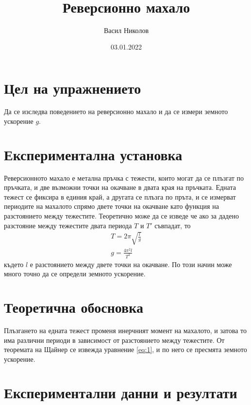 \documentclass[aps, prb, twocolumn, a4paper, floatfix, reprint]{revtex4-2}
\begin{document}
\title{Реверсионно махало}
\author{Васил Николов}
\noaffiliation
\date{03.01.2022}
\maketitle

\section{Цел на упражнението}
Да се изследва поведението на реверсионно махало и да се измери земното ускорение $g$.

\section{Експериментална установка}
Реверсионното махало е метална пръчка с тежести, които могат да се плъзгат по пръчката, и две възможни точки на окачване в двата края на пръчката. Едната тежест се фиксира в единия край, а другата се плъзга по пръта, и се измерват периодите на махалото спрямо двете точки на окачване като функция на разстоянието между тежестите. Теоретично може да се изведе че ако за дадено разстояние между тежестите двата периода $T$ и $T'$ съвпадат, то
\begin{gather*} 
    T = 2\pi \sqrt{\frac{l}{g}} \\
    g = \frac{4\pi^2 l}{T^2} \label{eq:1} \tag{1}
\end{gather*}
където $l$ е разстоянието между двете точки на окачване. По този начин може много точно да се определи земното ускорение.  

\section{Теоретична обосновка}
Плъзгането на едната тежест променя инерчният момент на махалото, и затова то има различни периоди в зависимост от разстоянието между тежестите. От теоремата на Щайнер се извежда уравнение \eqref{eq:1}, и по него се пресмята земното ускорение. 

\section{Експериментални данни и резултати}
\end{document}
